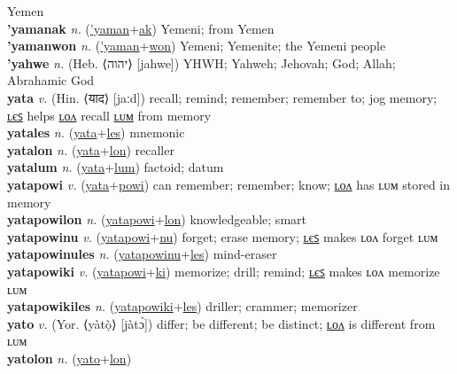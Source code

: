 Yemen \label{'yaman} \\
\textbf{'yamanak} \textit{n.} (\hyperref['yaman]{'yaman}+\hyperref[ak]{ak})
Yemeni; from Yemen \label{'yamanak} \\
\textbf{'yamanwon} \textit{n.} (\hyperref['yaman]{'yaman}+\hyperref[won]{won})
Yemeni; Yemenite; the Yemeni people \label{'yamanwon} \\
\textbf{'yahwe} \textit{n.} (Heb. ⟨יהוה‬⟩ [jahwe])
YHWH; Yahweh; Jehovah; God; Allah; Abrahamic God \label{'yahwe} \\
\textbf{yata} \textit{v.} (Hin. ⟨याद⟩ [jaːd])
recall; remind; remember; remember to; jog memory; \hyperref[yatales]{ʟєꜱ} helps \hyperref[yatalon]{ʟᴏᴧ} recall \hyperref[yatalum]{ʟᴜᴍ} from memory \label{yata} \\
\textbf{yatales} \textit{n.} (\hyperref[yata]{yata}+\hyperref[les]{les})
mnemonic \label{yatales} \\
\textbf{yatalon} \textit{n.} (\hyperref[yata]{yata}+\hyperref[lon]{lon})
recaller \label{yatalon} \\
\textbf{yatalum} \textit{n.} (\hyperref[yata]{yata}+\hyperref[lum]{lum})
factoid; datum \label{yatalum} \\
\textbf{yatapowi} \textit{v.} (\hyperref[yata]{yata}+\hyperref[powi]{powi})
can remember; remember; know; \hyperref[yatapowilon]{ʟᴏᴧ} has ʟᴜᴍ stored in memory \label{yatapowi} \\
\textbf{yatapowilon} \textit{n.} (\hyperref[yatapowi]{yatapowi}+\hyperref[lon]{lon})
knowledgeable; smart \label{yatapowilon} \\
\textbf{yatapowinu} \textit{v.} (\hyperref[yatapowi]{yatapowi}+\hyperref[nu]{nu})
forget; erase memory; \hyperref[yatapowinules]{ʟєꜱ} makes ʟᴏᴧ forget ʟᴜᴍ \label{yatapowinu} \\
\textbf{yatapowinules} \textit{n.} (\hyperref[yatapowinu]{yatapowinu}+\hyperref[les]{les})
mind-eraser \label{yatapowinules} \\
\textbf{yatapowiki} \textit{v.} (\hyperref[yatapowi]{yatapowi}+\hyperref[ki]{ki})
memorize; drill; remind; \hyperref[yatapowikiles]{ʟєꜱ} makes ʟᴏᴧ memorize ʟᴜᴍ \label{yatapowiki} \\
\textbf{yatapowikiles} \textit{n.} (\hyperref[yatapowiki]{yatapowiki}+\hyperref[les]{les})
driller; crammer; memorizer \label{yatapowikiles} \\
\textbf{yato} \textit{v.} (Yor. ⟨yàtọ̀⟩ [jàtɔ̀])
differ; be different; be distinct; \hyperref[yatolon]{ʟᴏᴧ} is different from ʟᴜᴍ \label{yato} \\
\textbf{yatolon} \textit{n.} (\hyperref[yato]{yato}+\hyperref[lon]{lon})
